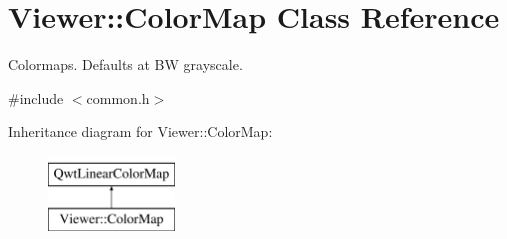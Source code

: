 \hypertarget{classViewer_1_1ColorMap}{}\section{Viewer\+:\+:Color\+Map Class Reference}
\label{classViewer_1_1ColorMap}


Colormaps. Defaults at BW grayscale.  




{\ttfamily \#include $<$common.\+h$>$}

Inheritance diagram for Viewer\+:\+:Color\+Map\+:\begin{figure}[H]
\begin{center}
\leavevmode
\includegraphics[height=2.000000cm]{classViewer_1_1ColorMap}
\end{center}
\end{figure}
